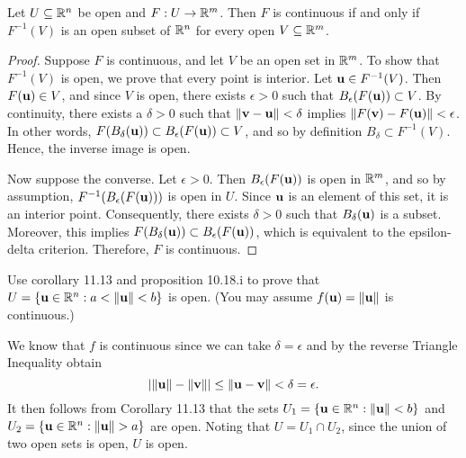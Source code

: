 \documentclass[letterpaper, twoside, 12pt]{book}
\begin{document}
\begin{theorem}[11.12]
  Let \(U\subseteq\mathbb R^n\) be open and \(F:U\to\mathbb R^m\).
  Then \(F\) is continuous
  if and only if \(F^{-1}(V)\) is an open subset of \(\mathbb R^n\) for every
  open \(V\subseteq\mathbb R^m\).
\end{theorem}

\begin{proof}
    Suppose \(F\) is continuous, and let \(V\) be an open set in \(\mathbb R^m\).
    To show that \(F^{-1}(V)\) is open, we prove that every point is 
    interior. Let \(\mathbf u \in F^{-1}(V)\). Then \(F(\mathbf u) \in V\),
    and since \(V\) is open, there exists \(\epsilon > 0\) such that
    \(B_{\epsilon}(F(\mathbf u)) \subset V\). By continuity, there exists
    a \(\delta > 0\) such that \(\|\mathbf v - \mathbf u\| < \delta\) implies
    \(\|F(\mathbf v) - F(\mathbf u)\| < \epsilon\). In other words,
    \(F(B_{\delta}(\mathbf u)) \subset B_{\epsilon}(F(\mathbf u)) \subset V\),
    and so by definition \(B_{\delta} \subset F^{-1}(V)\). Hence, the
    inverse image is open.

    Now suppose the converse. Let \(\epsilon > 0\). Then
    \(B_{\epsilon}(F(\mathbf u))\) is open in \(\mathbb R^m\), and so by assumption,
    \(F^{-1}(B_{\epsilon}(F(\mathbf u)))\) is open in \(U\). Since \(\mathbf u\)
    is an element of this set, it is an interior point. Consequently, 
    there exists \(\delta > 0\) such that \(B_{\delta}(\mathbf u)\) is 
    a subset. Moreover, this implies 
    \(F(B_{\delta}(\mathbf u)) \subset B_{\epsilon}(F(\mathbf u))\), which
    is equivalent to the epsilon-delta criterion. Therefore, \(F\)
    is continuous.
\end{proof}

\begin{example}[11.15]
  Use corollary 11.13 and proposition 10.18.i to prove that
  \(U=\{\mathbf u\in\mathbb R^n:a<\|\mathbf u\|<b\}\) is open.
  (You may assume \(f(\mathbf u)=\|\mathbf u\|\) is continuous.)
\end{example}

\begin{solution}
    We know that \(f\) is continuous since we can
    take \(\delta = \epsilon\) and by the reverse Triangle Inequality obtain
    \[ | \|\mathbf u\| - \|\mathbf v\| | \leq \|\mathbf u - \mathbf v\| < \delta = \epsilon .\]
    It then follows from Corollary 11.13 that the sets
    \(U_1 = \{\mathbf u \in \mathbb R^n : \|\mathbf u\| < b\}\) and
    \(U_2 = \{\mathbf u \in \mathbb R^n : \|\mathbf u\| > a\}\) are open.
    Noting that \(U = U_1 \cap U_2\), since the union of two
    open sets is open, \(U\) is open.
\end{solution}
\end{document}
